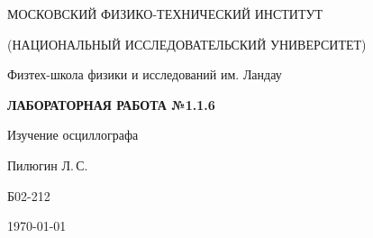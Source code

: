 
\begin{center}
    {
        \MakeUppercase{Московский физико-технический институт}

        \MakeUppercase{(Национальный исследовательский университет)}
    }

    {
        Физтех-школа физики и исследований им. Ландау
    }
    
    \vspace{200pt}
    {
        \Huge
        \bfseries
        \MakeUppercase{Лабораторная работа №1.1.6}
    }

    \vspace{24pt}
    {
        \Large
        Изучение осциллографа
    }

    \vspace{24pt}
    {
        \large
        Пилюгин Л.\,С.

        Б02-212
    }

    \vspace{2pt}
    {
        \large
        \today
    }
\end{center}

\newpage
{}
\setcounter{page}{2}
